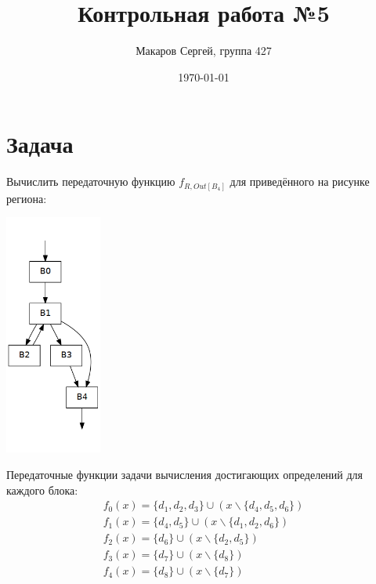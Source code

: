 \documentclass[11pt]{article}
\author{Макаров Сергей, группа 427}
\date{\today}
\title{Контрольная работа №5}
\begin{document}
\maketitle

\section{Задача}
\label{sec:org8dff5c3}
Вычислить передаточную функцию \(f_{R, Out[B_4]}\) для приведённого на рисунке региона:
\begin{center}
\includegraphics[height=300px]{cfg5.png}
\end{center}

\pagebreak
Передаточные функции задачи вычисления достигающих определений для каждого блока:
\begin{gather*}
f_0(x) = \{d_1, d_2, d_3\} \cup (x \backslash \{d_4, d_5, d_6\}) \\
f_1(x) = \{d_4, d_5\} \cup (x \backslash \{d_1, d_2, d_6\}) \\
f_2(x) = \{d_6\} \cup (x \backslash \{d_2, d_5\}) \\
f_3(x) = \{d_7\} \cup (x \backslash \{d_8\}) \\
f_4(x) = \{d_8\} \cup (x \backslash \{d_7\})
\end{gather*}
\end{document}
